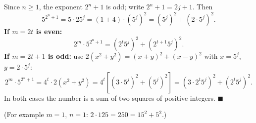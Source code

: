 Since $n\ge1$, the exponent $2^n+1$ is odd; write $2^n+1=2j+1$. Then
\[
5^{2^n+1}=5\cdot25^{j}=(1+4)\cdot\left(5^{j}\right)^2=\left(5^{j}\right)^2+\left(2\cdot5^{j}\right)^2 .
\]
\textbf{If $m=2t$ is even:}
\[
2^m\cdot5^{2^n+1}=\left(2^t5^j\right)^2+\left(2^{t+1}5^j\right)^2 .
\]
\textbf{If $m=2t+1$ is odd:} use $2(x^2+y^2)=(x+y)^2+(x-y)^2$ with $x=5^j$, $y=2\cdot5^j$:
\[
2^m\cdot5^{2^n+1}=4^t\cdot2\left(x^2+y^2\right)=4^t\left[(3\cdot5^j)^2+(5^j)^2\right]=\left(3\cdot2^t5^j\right)^2+\left(2^t5^j\right)^2 .
\]
In both cases the number is a sum of two squares of positive integers. $\blacksquare$

(For example $m=1$, $n=1$: $2\cdot125=250=15^2+5^2$.)
